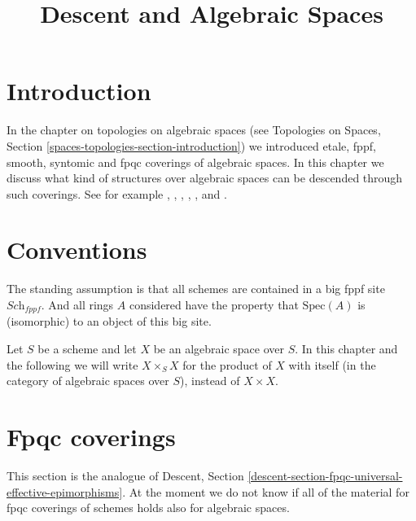 

%


\title{Descent and Algebraic Spaces}

\maketitle

\label{section-phantom}

\tableofcontents

\section{Introduction}
\label{section-introduction}

\noindent
In the chapter on topologies on algebraic spaces (see
Topologies on Spaces, Section \ref{spaces-topologies-section-introduction})
we introduced etale, fppf, smooth, syntomic and fpqc coverings of
algebraic spaces.
In this chapter we discuss what kind of structures over algebraic spaces
can be descended through such coverings.
See for example \cite{Gr-I}, \cite{Gr-II}, \cite{Gr-III},
\cite{Gr-IV}, \cite{Gr-V}, and \cite{Gr-VI}.



\section{Conventions}
\label{section-conventions}

\noindent
The standing assumption is that all schemes are contained in
a big fppf site $\textit{Sch}_{fppf}$. And all rings $A$ considered
have the property that $\text{Spec}(A)$ is (isomorphic) to an
object of this big site.

\medskip\noindent
Let $S$ be a scheme and let $X$ be an algebraic space over $S$.
In this chapter and the following we will write $X \times_S X$
for the product of $X$ with itself (in the category of algebraic
spaces over $S$), instead of $X \times X$.




\section{Fpqc coverings}
\label{section-fpqc}

\noindent
This section is the analogue of
Descent, Section \ref{descent-section-fpqc-universal-effective-epimorphisms}.
At the moment we do not know if all of the material for
fpqc coverings of schemes holds also for algebraic spaces.

